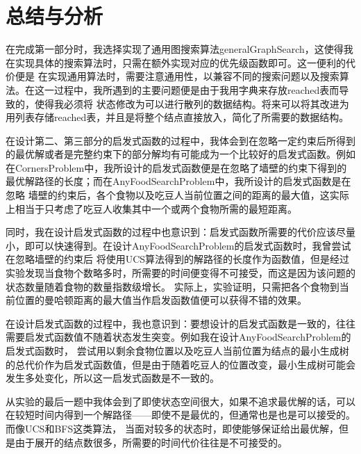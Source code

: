 \chapter{总结与分析}
%
%
在完成第一部分时，我选择实现了通用图搜索算法generalGraphSearch，这使得我在实现具体的搜索算法时，只需在额外实现对应的优先级函数即可。这一便利的代价便是
在实现通用算法时，需要注意通用性，以兼容不同的搜索问题以及搜索算法。在这一过程中，我所遇到的主要问题便是由于我用字典来存放reached表而导致的，使得我必须将
状态修改为可以进行散列的数据结构。将来可以将其改进为用列表存储reached表，并且是将整个结点直接放入，简化了所需要的数据结构。

在设计第二、第三部分的启发式函数的过程中，我体会到在忽略一定约束后所得到的最优解或者是完整约束下的部分解均有可能成为一个比较好的启发式函数。例如
在CornersProblem中，我所设计的启发式函数便是在忽略了墙壁的约束下得到的最优解路径的长度；而在AnyFoodSearchProblem中，我所设计的启发式函数是在忽略
墙壁的约束后，各个食物以及吃豆人当前位置之间的距离的最大值，这实际上相当于只考虑了吃豆人收集其中一个或两个食物所需的最短距离。

同时，我在设计启发式函数的过程中也意识到：启发式函数所需要的代价应该尽量小，即可以快速得到。在设计AnyFoodSearchProblem的启发式函数时，我曾尝试在忽略墙壁的约束后
将使用UCS算法得到的解路径的长度作为函数值，但是经过实验发现当食物个数略多时，所需要的时间便变得不可接受，而这是因为该问题的状态数量随着食物的数量指数级增长。
实际上，实验证明，只需把各个食物到当前位置的曼哈顿距离的最大值当作启发函数值便可以获得不错的效果。

在设计启发式函数的过程中，我也意识到：要想设计的启发式函数是一致的，往往需要启发式函数值不随着状态发生突变。例如我在设计AnyFoodSearchProblem的启发式函数时，
尝试用以剩余食物位置以及吃豆人当前位置为结点的最小生成树的总代价作为启发式函数值，但是由于随着吃豆人的位置改变，最小生成树可能会发生多处变化，所以这一启发式函数是不一致的。

从实验的最后一题中我体会到了即使状态空间很大，如果不追求最优解的话，可以在较短时间内得到一个解路径——即使不是最优的，但通常也是也是可以接受的。而像UCS和BFS这类算法，
当面对较多的状态时，即使能够保证给出最优解，但是由于展开的结点数很多，所需要的时间代价往往是不可接受的。